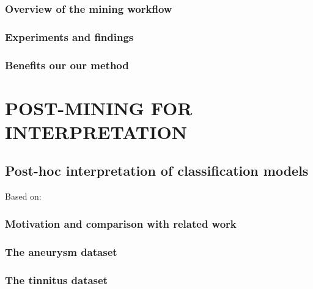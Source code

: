 \documentclass[
]{book}
\begin{document}
\hypertarget{overview-of-the-mining-workflow-1}{%
\section{Overview of the mining workflow}\label{overview-of-the-mining-workflow-1}}

\hypertarget{experiments-and-findings-3}{%
\section{Experiments and findings}\label{experiments-and-findings-3}}

\hypertarget{benefits-our-our-method-2}{%
\section{Benefits our our method}\label{benefits-our-our-method-2}}

\hypertarget{part-post-mining-for-interpretation}{%
\part{POST-MINING FOR INTERPRETATION}\label{part-post-mining-for-interpretation}}

\hypertarget{iml}{%
\chapter{Post-hoc interpretation of classification models}\label{iml}}

Based on: \autocite{Niemann:CBMS2018,Niemann:SREP2020,Niemann:PONE2020,Niemann:Frontiers2020}

\hypertarget{motivation-and-comparison-with-related-work-4}{%
\section{Motivation and comparison with related work}\label{motivation-and-comparison-with-related-work-4}}

\hypertarget{the-aneurysm-dataset}{%
\section{The aneurysm dataset}\label{the-aneurysm-dataset}}

\hypertarget{the-tinnitus-dataset}{%
\section{The tinnitus dataset}\label{the-tinnitus-dataset}}
\end{document}

